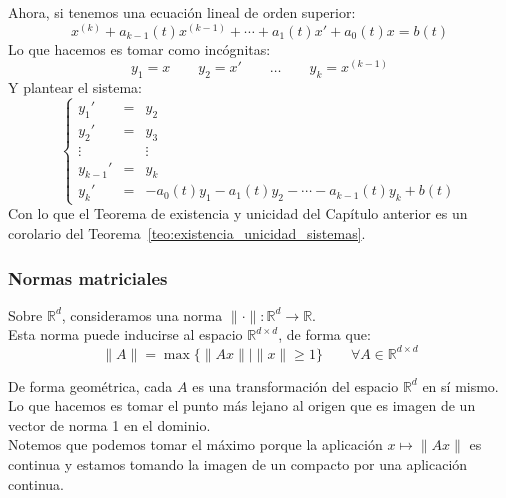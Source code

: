 \begin{coro}
Ahora, si tenemos una ecuación lineal de orden superior:
\begin{equation*}
    x^{(k)} + a_{k-1}(t) x^{(k-1)} + \cdots + a_1(t)x' + a_0(t)x = b(t)
\end{equation*}
Lo que hacemos es tomar como incógnitas:
\begin{equation*}
    y_1 = x \qquad y_2 = x' \qquad \ldots \qquad y_k = x^{(k-1)}
\end{equation*}
Y plantear el sistema:
\begin{equation*}
    \left\{\begin{array}{rcl}
            y_1' &=& y_2 \\
            y_2' &=& y_3 \\
            \vdots && \vdots \\
            y_{k-1}' &=& y_k \\
            y_k' &=& -a_0(t)y_1 -a_1(t) y_2 - \cdots - a_{k-1}(t)y_k + b(t)
    \end{array}\right.
\end{equation*}
Con lo que el Teorema de existencia y unicidad del Capítulo anterior es un corolario del Teorema~\ref{teo:existencia_unicidad_sistemas}.
\end{coro}

\subsubsection{Normas matriciales}
Sobre $\mathbb{R}^d$, consideramos una norma $\|\cdot \|:\mathbb{R}^d\rightarrow\mathbb{R}$.\\

Esta norma puede inducirse al espacio $\mathbb{R}^{d\times d}$, de forma que:
\begin{equation*}
    \|A\| = \max\{\|Ax\| \mid \|x\|\geq 1\} \qquad \forall A\in \mathbb{R}^{d\times d}
\end{equation*}

De forma geométrica, cada $A$ es una transformación del espacio $\mathbb{R}^d$ en sí mismo. Lo que hacemos es tomar el punto más lejano al origen que es imagen de un vector de norma 1 en el dominio.\\

Notemos que podemos tomar el máximo porque la aplicación $x\mapsto \|Ax\|$ es continua y estamos tomando la imagen de un compacto por una aplicación continua.

